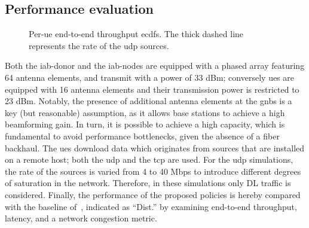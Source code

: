 

\subsection{Performance evaluation}
\label{Sec:perf_eval}

\begin{figure}[t!]
	\centering
  	\hfill
    \caption{Per-\gls{ue} end-to-end throughput \glspl{ecdf}. The thick dashed line represents the rate of the \gls{udp} sources.}
    \label{Fig:thr_ECDF}   
    \vspace{-.6cm} 
\end{figure}

Both the \gls{iab}-donor and the \gls{iab}-nodes are equipped with a phased array featuring 64 antenna elements, and transmit with a power of 33 dBm; conversely \glspl{ue} are equipped with 16 antenna elements and their transmission power is restricted to 23 dBm. Notably, the presence of additional antenna elements at the \glspl{gnb} is a key (but reasonable) assumption, as it allows base stations to achieve a high beamforming gain. In turn, it is possible to achieve a high capacity, which is fundamental to avoid performance bottlenecks, given the absence of a fiber backhaul.
The \glspl{ue} download data which originates from sources that are installed on a remote host; both the \gls{udp} and the \gls{tcp} are used. For the \gls{udp} simulations, the rate of the sources is varied from 4 to 40 Mbps to introduce different degrees of saturation in the network. Therefore, in these simulations only DL traffic is considered.
Finally, the performance of the proposed policies is hereby compared with the baseline of~\cite{polese2018end}, indicated as ``Dist.'' by examining end-to-end throughput, latency, and a network congestion metric.

